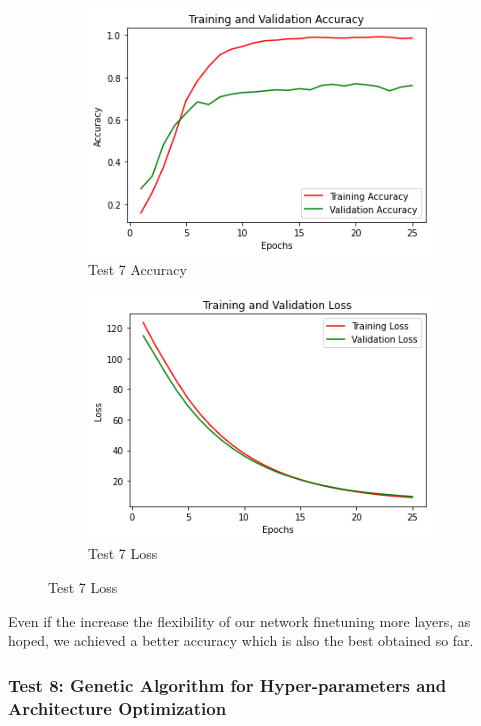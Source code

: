 \begin{figure}[H]
	\begin{subfigure}{0.5\textwidth}
		\includegraphics[width=0.9\linewidth]{img/vgg16/vgg16ft2dropregacc.png} 
		\caption{Test 7 Accuracy}
		\label{fig:vgg16ft2dropregacc}
	\end{subfigure}
	\begin{subfigure}{0.5\textwidth}
		\includegraphics[width=0.9\linewidth]{img/vgg16/vgg16ft2dropregloss.png}
		\caption{Test 7 Loss}
		\label{fig:vgg16ft2dropregloss}
	\end{subfigure}
\end{figure}

Even if the increase the flexibility of our network finetuning more layers, as hoped, we achieved a better accuracy which is also the best obtained so far.




\subsubsection{Test 8: Genetic Algorithm for Hyper-parameters and Architecture Optimization}





